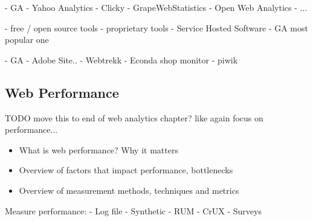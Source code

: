 


- GA
- Yahoo Analytics
- Clicky
- GrapeWebStatistics
- Open Web Analytics
- ...


- free / open source tools
- proprietary tools
- Service Hosted Software
- GA most popular one





- GA
- Adobe Site..
- Webtrekk
- Econda shop monitor
- piwik








\subsection{Web Performance}
TODO move this to end of web analytics chapter? like again focus on performance...
\begin{itemize}
\item What is web performance? Why it matters
\item Overview of factors that impact performance, bottlenecks
\item Overview of measurement methods, techniques and metrics
\end{itemize}









Measure performance:
- Log file
- Synthetic
- RUM
- CrUX
- Surveys










